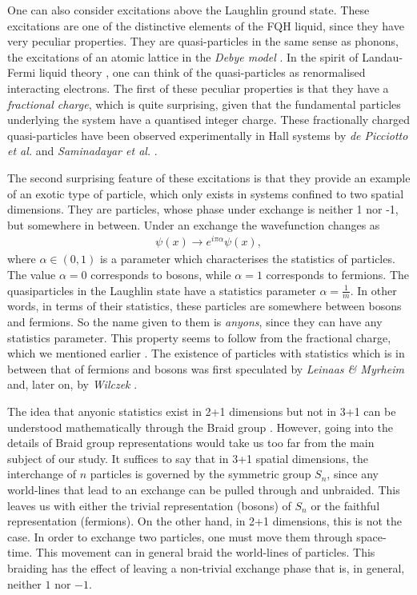  One can also consider excitations above the Laughlin ground state. These excitations are one of the distinctive elements of the FQH liquid, since they have very peculiar properties. They are quasi-particles in the same sense as phonons, the excitations of an atomic lattice in the \textit{Debye model} \cite{Debye1912}. In the spirit of Landau-Fermi liquid theory \cite{Landau:1956zuh}, one can think of the quasi-particles as renormalised interacting electrons. The first of these peculiar properties is that they have a \textit{fractional charge}, which is quite surprising, given that the fundamental particles underlying the system have a quantised integer charge. These fractionally charged quasi-particles have been observed experimentally in Hall systems by \textit{de Picciotto et al.} and \textit{Saminadayar et al.} \cite{dePicciotto:1997qc, PhysRevLett.79.2526}.

 The second surprising feature of these excitations is that they provide an example of an exotic type of particle, which only exists in systems confined to two spatial dimensions. They are particles, whose phase under exchange is neither 1 nor -1, but somewhere in between. Under an exchange the wavefunction changes as
\begin{align}
    \psi(x) \rightarrow e^{ i\pi  \alpha} \psi(x),
\end{align}
where $\alpha \in (0,1)$ is a parameter which characterises the statistics of particles. The value $\alpha=0 $ corresponds to bosons, while $\alpha=1$ corresponds to fermions. The quasiparticles in the Laughlin state have a statistics parameter $\alpha = \frac{1}{m}$. In other words, in terms of their statistics, these particles are somewhere between bosons and fermions.  So the name given to them is \textit{anyons}, since they can have any statistics parameter. This property seems to follow from the fractional charge, which we mentioned earlier \cite{Halperin:1983zz, Wilczek:1981du, Polyakov:1988md}. The existence of particles with statistics which is in between that of fermions and bosons was first speculated by \textit{Leinaas \& Myrheim} \cite{Leinaas:1977fm} and, later on, by \textit{Wilczek} \cite{PhysRevLett.49.957}.

 The idea that anyonic statistics exist in 2+1 dimensions but not in 3+1 can be understood mathematically through the Braid group \cite{PhysRevLett.52.2103, Artin1947}. However, going into the details of Braid group representations would take us too far from the main subject of our study. It suffices to say that in 3+1 spatial dimensions, the interchange of $n$ particles is governed by the symmetric group $S_n$, since any world-lines that lead to an exchange can be pulled through and unbraided. This leaves us with either the trivial representation (bosons) of $S_n$ or the faithful representation (fermions). On the other hand, in 2+1 dimensions, this is not the case. In order to exchange two particles, one must move them through space-time. This movement can in general braid the world-lines of particles. This braiding has the effect of leaving a non-trivial exchange phase that is, in general, neither $1$ nor $-1$.


